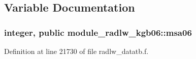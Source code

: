 \subsection{Variable Documentation}
\subsubsection[{\texorpdfstring{msa06}{msa06}}]{\setlength{\rightskip}{0pt plus 5cm}integer, public module\+\_\+radlw\+\_\+kgb06\+::msa06}\hypertarget{namespacemodule__radlw__kgb06_add7b5d0d3ea44e1e677948c33e870333}{}\label{namespacemodule__radlw__kgb06_add7b5d0d3ea44e1e677948c33e870333}


Definition at line 21730 of file radlw\+\_\+datatb.\+f.

